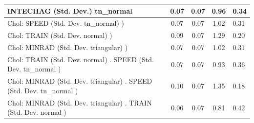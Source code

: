 \begin{table}
\begin{center}
\begin{tabular}{|l|l|c|c|c|l|}
			\hline
			INTECHAG (Std. Dev.) tn_normal &  & 0.07 & 0.07 & 0.96 & 0.34 \\
			\hline
			 Chol: SPEED (Std. Dev. tn_normal) ) &  & 0.07 & 0.07 & 1.02 & 0.31 \\
			\hline
			 Chol: TRAIN (Std. Dev. normal) ) &  & 0.09 & 0.07 & 1.29 & 0.20 \\
			\hline
			 Chol: MINRAD (Std. Dev. triangular) ) &  & 0.07 & 0.07 & 1.02 & 0.31 \\
			\hline
			 Chol: TRAIN (Std. Dev. normal) . SPEED (Std. Dev.   tn_normal ) &  & 0.07 & 0.07 & 0.93 & 0.36 \\
			\hline
			 Chol: MINRAD (Std. Dev. triangular) . SPEED (Std. Dev.   tn_normal ) &  & 0.10 & 0.07 & 1.35 & 0.18 \\
			\hline
			 Chol: MINRAD (Std. Dev. triangular) . TRAIN (Std. Dev.   normal ) &  & 0.06 & 0.07 & 0.81 & 0.42 \\
			\hline
		\end{tabular}
	\end{center}
\end{table}